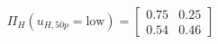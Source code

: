 \documentclass[border=3mm,preview]{standalone}\usepackage{amsmath}
\begin{document}
\[
\Pi_{H} \left( u_{H,50p} = \text{low} \right)= 
\left[\begin{array}{cc} 
0.75 & 0.25 \\ 
0.54 & 0.46 
\end{array}\right] \] 
\end{document}
